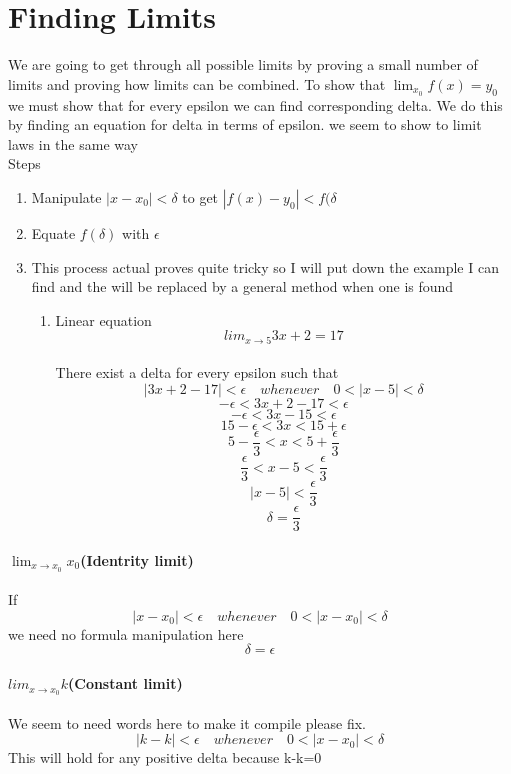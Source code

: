 \documentclass[12pt, a4paper,oneside]{book}
\begin{document}
\section{Finding Limits}
	\begin{paragraph}
		We are going to get through all possible limits by proving a small number of limits and proving how 		limits can be combined.
		To show that \(\lim_{x_0}f(x)=y_0\) we must show that for every epsilon we can find corresponding 			delta. We do this by finding an equation for delta in terms of epsilon. we seem to show to limit laws 			in the same way\\ 
		Steps \begin{enumerate}
				\item{Manipulate \( |x-x_0|<\delta\) to get \(|f(x)-y_0|<f(\delta\) }
				\item{Equate \(f(\delta)\) with \(\epsilon\)}
				\item{This process actual proves quite tricky so I will put down the example I can find and the 				will be replaced by a general method when one is found
					\begin{enumerate}
						\item{Linear equation \[lim_{x\to 5} 3x+2 = 17\] \\
						There exist a delta for every epsilon such that 
						\[|3x+2-17|<\epsilon \quad whenever \quad 0<|x-5|<\delta\]
						\[-\epsilon<3x+2-17<\epsilon\] \[-\epsilon<3x-15<\epsilon\]
						\[15-\epsilon<3x< 15+ \epsilon\] 
						\[5-\frac{\epsilon}{3}<x<5+\frac{\epsilon}{3}\] 
						\[\frac{\epsilon}{3}<x-5<\frac{\epsilon}{3}\] 
						\[|x-5|<\frac{\epsilon}{3}\] \[\delta = \frac{\epsilon}{3}\]} 
				\end{enumerate}}
			\end{enumerate}
	\end{paragraph}
	
    \paragraph{\(\lim_{x\to x_0} x_0\)(Identrity limit)} 
		\begin{paragraph} If
			\[|x-x_0|<\epsilon \quad whenever \quad 0<|x-x_0|< \delta \]
			we need no formula manipulation here 
			\[\delta = \epsilon\]
	\end{paragraph}
	
    \paragraph{\(lim_{x\to x_0} k\)(Constant limit)}
		\begin{paragraph} We seem to need words here to make it compile please fix.
			\[ |k-k|<\epsilon  \quad whenever \quad 0<|x-x_0|<  \delta \] 
			This will hold for any positive delta because k-k=0
	\end{paragraph}
\end{document}
